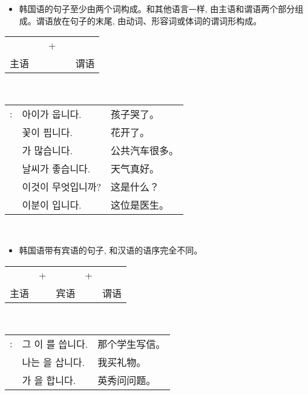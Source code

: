 \begin{grammar}
	\begin{grammarsect}[句子结构]
		\begin{itemize}
			\item 韩国语的句子至少由两个词构成。和其他语言ᅳ样, 由主语和谓语两个部分组成。谓语放在句子的末尾, 由动词、形容词或体词的谓词形构成。
		\end{itemize}
		\begin{center}
			\begin{tabular}{lllll}
				\kr \ruby{主語}{주어} & \qquad & + & \qquad & \kr \ruby{敘述語}{서술어} \\
				主语                & \qquad &   & \qquad & 谓语
			\end{tabular}\\
		\end{center}
		\begin{tabular}{lll}
			\kr \ruby{例}{예}: & \kr 아이가 웁니다.              & 孩子哭了。   \\
			                 & \kr 꽃이 핍니다.               & 花开了。    \\
			                 & \kr \ruby{버스}{bus}가 많습니다. & 公共汽车很多。 \\
			                 & \kr 날씨가 좋습니다.             & 天气真好。   \\
			                 & \kr 이것이 무엇입니까?            & 这是什么？   \\
			                 & \kr 이분이 \ruby{醫師}{의사}입니다. & 这位是医生。
		\end{tabular}\\
	\end{grammarsect}
	\begin{itemize}
		\item 韩国语带有宾语的句子, 和汉语的语序完全不同。
	\end{itemize}
	\begin{center}
		\begin{tabular}{lllll}
			\kr \ruby{主語}{주어} & + & \kr \ruby{目的語}{목적어} & + & \kr \ruby{敘述語}{서술어} \\
			主语                &   & 宾语                  &   & 谓语
		\end{tabular}\\
	\end{center}
	\begin{tabular}{lll}
		\kr \ruby{例}{예}: & \kr 그 \ruby{學生}{학생}이 \ruby{便紙}{편지}를 씁니다. & 那个学生写信。 \\
		                 & \kr 나는 \ruby{膳物}{선물}을 삽니다.               & 我买礼物。   \\
		                 & \kr \ruby{英秀}{영수}가 \ruby{質問}{질문}을 합니다.   & 英秀问问题。
	\end{tabular}\\
\end{grammar}
